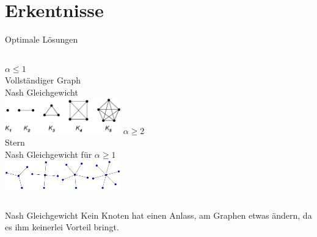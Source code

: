 \documentclass[mathserif, aspectratio=169]{beamer}
\begin{document}
\section{Erkentnisse}
\begin{frame}
{Optimale L\"osungen}
\begin{columns}
\textbf{$\alpha \leq 1$}\\
Vollst\"andiger Graph\\
Nash Gleichgewicht\\
\includegraphics[width=5cm]{pics/Complete_graph_example.png}
\textbf{$\alpha \geq 2$}\\
Stern\\
Nash Gleichgewicht f\"ur $\alpha \geq 1$ \\
\includegraphics[width=5cm]{pics/star.png}
\end{columns}
\begin{exampleblock}
{Nash Gleichgewicht}
Kein Knoten hat einen Anlass, am Graphen etwas \"andern, da es ihm keinerlei Vorteil bringt.
\end{exampleblock}

\end{frame}
\end{document}
